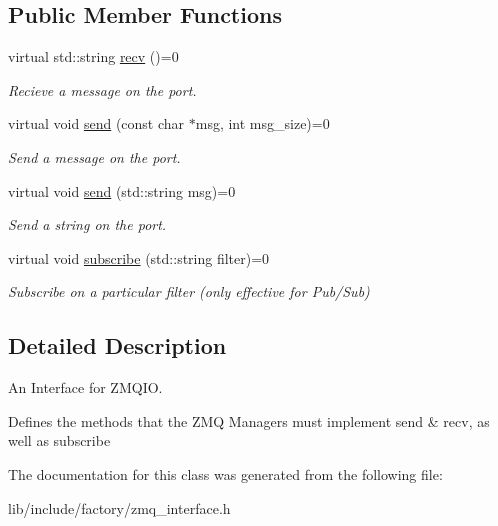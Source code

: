 \subsection*{Public Member Functions}
\begin{DoxyCompactItemize}
\item 
\hypertarget{classZmqio_a9365ac0ed42905898502e16857997acc}{virtual std\-::string \hyperlink{classZmqio_a9365ac0ed42905898502e16857997acc}{recv} ()=0}\label{classZmqio_a9365ac0ed42905898502e16857997acc}

\begin{DoxyCompactList}\small\item\em Recieve a message on the port. \end{DoxyCompactList}\item 
\hypertarget{classZmqio_a858e00e8ac5c4d1d60c665fa7c0716f0}{virtual void \hyperlink{classZmqio_a858e00e8ac5c4d1d60c665fa7c0716f0}{send} (const char $\ast$msg, int msg\-\_\-size)=0}\label{classZmqio_a858e00e8ac5c4d1d60c665fa7c0716f0}

\begin{DoxyCompactList}\small\item\em Send a message on the port. \end{DoxyCompactList}\item 
\hypertarget{classZmqio_a079f5752b553ddb2e5a2da565bcf162c}{virtual void \hyperlink{classZmqio_a079f5752b553ddb2e5a2da565bcf162c}{send} (std\-::string msg)=0}\label{classZmqio_a079f5752b553ddb2e5a2da565bcf162c}

\begin{DoxyCompactList}\small\item\em Send a string on the port. \end{DoxyCompactList}\item 
\hypertarget{classZmqio_aa315934401c5a3ba2eb502c16a3a6aca}{virtual void \hyperlink{classZmqio_aa315934401c5a3ba2eb502c16a3a6aca}{subscribe} (std\-::string filter)=0}\label{classZmqio_aa315934401c5a3ba2eb502c16a3a6aca}

\begin{DoxyCompactList}\small\item\em Subscribe on a particular filter (only effective for Pub/\-Sub) \end{DoxyCompactList}\end{DoxyCompactItemize}


\subsection{Detailed Description}
An Interface for Z\-M\-Q\-I\-O. 

Defines the methods that the Z\-M\-Q Managers must implement send \& recv, as well as subscribe 

The documentation for this class was generated from the following file\-:\begin{DoxyCompactItemize}
\item 
lib/include/factory/zmq\-\_\-interface.\-h\end{DoxyCompactItemize}
